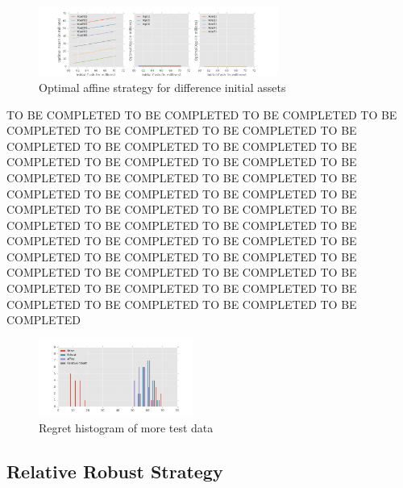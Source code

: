 \documentclass[letterpaper, 10 pt, conference]{ieeeconf}
\begin{document}
    \begin{figure}
       \centering
       \includegraphics[width=0.7\textwidth]{affine.png}
        \caption{Optimal affine strategy for difference initial assets}
        \label{fig:affine}
    \end{figure}
    TO BE COMPLETED TO BE COMPLETED TO BE COMPLETED TO BE COMPLETED TO BE COMPLETED TO BE COMPLETED TO BE COMPLETED TO BE COMPLETED TO BE COMPLETED TO BE COMPLETED TO BE COMPLETED TO BE COMPLETED TO BE COMPLETED TO BE COMPLETED TO BE COMPLETED TO BE COMPLETED TO BE COMPLETED TO BE COMPLETED TO BE COMPLETED TO BE COMPLETED TO BE COMPLETED TO BE COMPLETED TO BE COMPLETED TO BE COMPLETED TO BE COMPLETED TO BE COMPLETED TO BE COMPLETED TO BE COMPLETED TO BE COMPLETED TO BE COMPLETED TO BE COMPLETED TO BE COMPLETED TO BE COMPLETED TO BE COMPLETED TO BE COMPLETED TO BE COMPLETED TO BE COMPLETED TO BE COMPLETED TO BE COMPLETED TO BE COMPLETED 


    \begin{figure}
       \centering
       \includegraphics[width=0.45\textwidth]{regret.png}
        \caption{Regret histogram of more test data}
        \label{fig:regret}
    \end{figure}

\subsection{Relative Robust Strategy}
\end{document}
